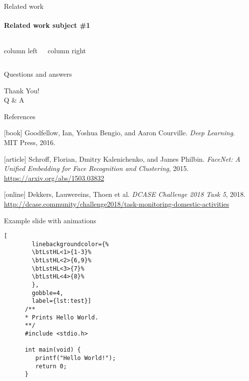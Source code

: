 
\begin{frame}{Related work}
    \framesubtitle{Related work subject \#1}
    \begin{columns}[T]

        column left

        column right
    \end{columns}


\end{frame}

\begin{frame}{Questions and answers}
    \begin{center}
    {\fontsize{40}{50}\selectfont Thank You! \\[10pt] Q \& A}
    \end{center}
\end{frame}

\begin{frame}[allowframebreaks]{References}
    \begin{thebibliography}{}
        [book]
        Goodfellow, Ian, Yoshua Bengio, and Aaron Courville.
        \newblock \emph{Deep Learning}.
        \newblock MIT Press, 2016.

        [article]
        Schroff, Florian, Dmitry Kalenichenko, and James Philbin.
        \newblock \emph{FaceNet: A Unified Embedding for Face Recognition and Clustering}, 2015.
        \newblock \url{https://arxiv.org/abs/1503.03832}

        [online]
        Dekkers, Lauwereins, Thoen et al.
        \newblock \emph{DCASE Challenge 2018 Task 5}, 2018.
        \newblock \url{http://dcase.community/challenge2018/task-monitoring-domestic-activities}
    \end{thebibliography}
\end{frame}

\begin{frame}[fragile]{Example slide with animations}
    \begin{lstlisting}[
        linebackgroundcolor={%
        \btLstHL<1>{1-3}%
        \btLstHL<2>{6,9}%
        \btLstHL<3>{7}%
        \btLstHL<4>{8}%
        },
        gobble=4,
        label={lst:test}]
      /**
      * Prints Hello World.
      **/
      #include <stdio.h>

      int main(void) {
         printf("Hello World!");
         return 0;
      }
    \end{lstlisting}

\end{frame}

